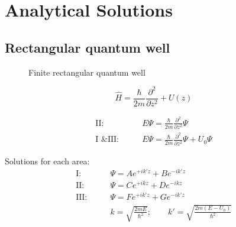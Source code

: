 \section{Analytical Solutions}
	\subsection{Rectangular quantum well}
		\begin{figure}[!h]
			\centering
			
			\caption{Finite rectangular quantum well}
		\end{figure}
		
		\begin{equation}
			\hat{H} = \frac{\hbar}{2m} \frac{\partial^2}{\partial z^2} + U(z)
		\end{equation}
		
		\begin{align}
			\text{II:}&\qquad E\Psi = \frac{\hbar}{2m} \frac{\partial^2}{\partial z^2}\Psi \\
			\text{I \& III:}& \qquad E\Psi = \frac{\hbar}{2m} \frac{\partial^2}{\partial z^2}\Psi + U_0\Psi 
		\end{align}
				
		Solutions for each area:
		\begin{align}
			\text{I:}&\qquad \Psi = A e^{+ik'z} + B e^{-ik'z} \\
			\text{II:}&\qquad \Psi = C e^{+ikz} + D e^{-ikz} \\
			\text{III:}&\qquad \Psi = F e^{+ik'z} + G e^{-ik'z} \\
			&\qquad k = \sqrt{\frac{2mE}{\hbar^2}};\qquad k' = \sqrt{\frac{2m(E-U_0)}{\hbar^2}}
		\end{align}
